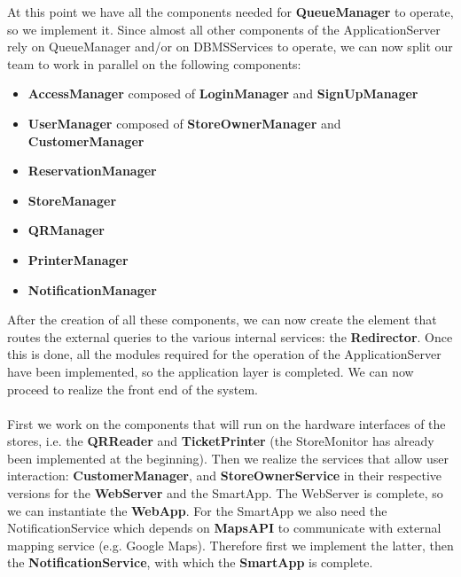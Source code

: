 At this point we have all the components needed for \textbf{QueueManager} to operate, so we implement it. Since almost all other components of the ApplicationServer rely on QueueManager and/or on DBMSServices to operate, we can now split our team to work in parallel on the following components: 
\begin{itemize}
	\item \textbf{AccessManager} composed of \textbf{LoginManager} and \textbf{SignUpManager}
	\item \textbf{UserManager} composed of \textbf{StoreOwnerManager} and \textbf{CustomerManager}
	\item \textbf{ReservationManager}
	\item \textbf{StoreManager}
	\item \textbf{QRManager}
	\item \textbf{PrinterManager}
	\item \textbf{NotificationManager}
\end{itemize}
After the creation of all these components, we can now create the element that routes the external queries to the various internal services: the \textbf{Redirector}.
Once this is done, all the modules required for the operation of the ApplicationServer have been implemented, so the application layer is completed. We can now proceed to realize the front end of the system.\\\\
First we work on the components that will run on the hardware interfaces of the stores, i.e. the \textbf{QRReader} and \textbf{TicketPrinter} (the StoreMonitor has already been implemented at the beginning). Then we realize the services that allow user interaction: \textbf{CustomerManager}, and \textbf{StoreOwnerService} in their respective versions for the \textbf{WebServer} and the SmartApp. The WebServer is complete, so we can instantiate the \textbf{WebApp}. For the SmartApp we also need the NotificationService which depends on \textbf{MapsAPI} to communicate with external mapping service (e.g. Google Maps). Therefore first we implement the latter, then the \textbf{NotificationService}, with which the \textbf{SmartApp} is complete.
